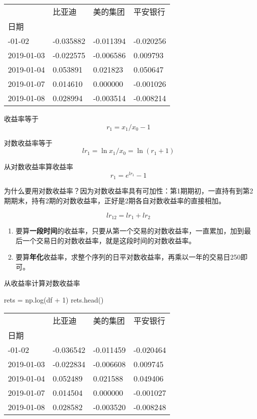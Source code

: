 \documentclass[
  letterpaper,
  DIV=11,
  numbers=noendperiod]{scrreprt}
\newenvironment{Shaded}{\begin{snugshade}}{\end{snugshade}}
\newcommand{\DecValTok}[1]{\textcolor[rgb]{0.68,0.00,0.00}{#1}}
\newcommand{\NormalTok}[1]{\textcolor[rgb]{0.00,0.23,0.31}{#1}}
\newcommand{\OperatorTok}[1]{\textcolor[rgb]{0.37,0.37,0.37}{#1}}
\providecommand{\tightlist}{%
  \setlength{\itemsep}{0pt}\setlength{\parskip}{0pt}}\usepackage{longtable,booktabs,array}
\begin{document}
\begin{longtable}[]{@{}llll@{}}
\toprule\noalign{}
& 比亚迪 & 美的集团 & 平安银行 \\
日期 & & & \\
\midrule\noalign{}
\endhead
\bottomrule\noalign{}
\endlastfoot
2019-01-02 & -0.035882 & -0.011394 & -0.020256 \\
2019-01-03 & -0.022575 & -0.006586 & 0.009793 \\
2019-01-04 & 0.053891 & 0.021823 & 0.050647 \\
2019-01-07 & 0.014610 & 0.000000 & -0.001026 \\
2019-01-08 & 0.028994 & -0.003514 & -0.008214 \\
\end{longtable}

收益率等于 \[
r_1 = x_1/x_0 - 1
\]

对数收益率等于 \[
lr_1 = \ln {x_1/x_0} = \ln(r_1 + 1)
\]

从对数收益率算收益率 \[
r_1 = e^{lr_1} - 1
\]

为什么要用对数收益率？因为对数收益率具有可加性：第1期期初，一直持有到第2期期末，持有2期的对数收益率，正好是2期各自对数收益率的直接相加。

\[
lr_{12} = lr_1 + lr_2
\]

\begin{enumerate}
\def\labelenumi{\arabic{enumi}.}
\tightlist
\item
  要算\textbf{一段时间}的收益率，只要从第一个交易的对数收益率，一直累加，加到最后一个交易日的对数收益率，就是这段时间的对数收益率。
\item
  要算\textbf{年化}收益率，求整个序列的日平对数收益率，再乘以一年的交易日250即可。
\end{enumerate}

从收益率计算对数收益率

\begin{Shaded}
\begin{Highlighting}[]
\NormalTok{rets }\OperatorTok{=}\NormalTok{ np.log(df }\OperatorTok{+} \DecValTok{1}\NormalTok{)}
\NormalTok{rets.head()}
\end{Highlighting}
\end{Shaded}

\begin{longtable}[]{@{}llll@{}}
\toprule\noalign{}
& 比亚迪 & 美的集团 & 平安银行 \\
日期 & & & \\
\midrule\noalign{}
\endhead
\bottomrule\noalign{}
\endlastfoot
2019-01-02 & -0.036542 & -0.011459 & -0.020464 \\
2019-01-03 & -0.022834 & -0.006608 & 0.009745 \\
2019-01-04 & 0.052489 & 0.021588 & 0.049406 \\
2019-01-07 & 0.014504 & 0.000000 & -0.001027 \\
2019-01-08 & 0.028582 & -0.003520 & -0.008248 \\
\end{longtable}
\end{document}
